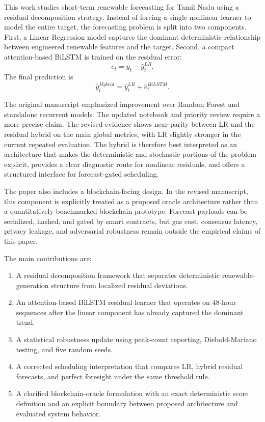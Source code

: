 \documentclass[journal]{IEEEtran}
\begin{document}
This work studies short-term renewable forecasting for Tamil Nadu using a residual decomposition strategy. Instead of forcing a single nonlinear learner to model the entire target, the forecasting problem is split into two components. First, a Linear Regression model captures the dominant deterministic relationship between engineered renewable features and the target. Second, a compact attention-based BiLSTM is trained on the residual error:
\begin{equation}
e_t = y_t - \hat{y}^{LR}_t .
\end{equation}
The final prediction is
\begin{equation}
\hat{y}^{Hybrid}_t = \hat{y}^{LR}_t + \hat{e}^{BiLSTM}_t .
\end{equation}

The original manuscript emphasized improvement over Random Forest and standalone recurrent models. The updated notebook and priority review require a more precise claim. The revised evidence shows near-parity between LR and the residual hybrid on the main global metrics, with LR slightly stronger in the current repeated evaluation. The hybrid is therefore best interpreted as an architecture that makes the deterministic and stochastic portions of the problem explicit, provides a clear diagnostic route for nonlinear residuals, and offers a structured interface for forecast-gated scheduling.

The paper also includes a blockchain-facing design. In the revised manuscript, this component is explicitly treated as a proposed oracle architecture rather than a quantitatively benchmarked blockchain prototype. Forecast payloads can be serialized, hashed, and gated by smart contracts, but gas cost, consensus latency, privacy leakage, and adversarial robustness remain outside the empirical claims of this paper.

The main contributions are:
\begin{enumerate}
\item A residual decomposition framework that separates deterministic renewable-generation structure from localized residual deviations.
\item An attention-based BiLSTM residual learner that operates on 48-hour sequences after the linear component has already captured the dominant trend.
\item A statistical robustness update using peak-count reporting, Diebold-Mariano testing, and five random seeds.
\item A corrected scheduling interpretation that compares LR, hybrid residual forecasts, and perfect foresight under the same threshold rule.
\item A clarified blockchain-oracle formulation with an exact deterministic score definition and an explicit boundary between proposed architecture and evaluated system behavior.
\end{enumerate}
\end{document}
